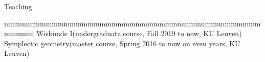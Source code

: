 \documentclass[12p]{resume}
\begin{document}
\begin{category}{Teaching} 
 
\vspace*{-0.2cm}
\begin{tabbing}
mmmmmmmmmmmmmmmmmmmmmmmm\= mmmmmmmmmmmmmmmmmmmmmmmm \kill
Wiskunde I\>(undergraduate  course, Fall 2019 to now, KU Leuven)\\
Symplectic geometry\>(master course, Spring 2016 to now on even years, KU Leuven)\\

\end{tabbing}
\end{category}
\end{document}
